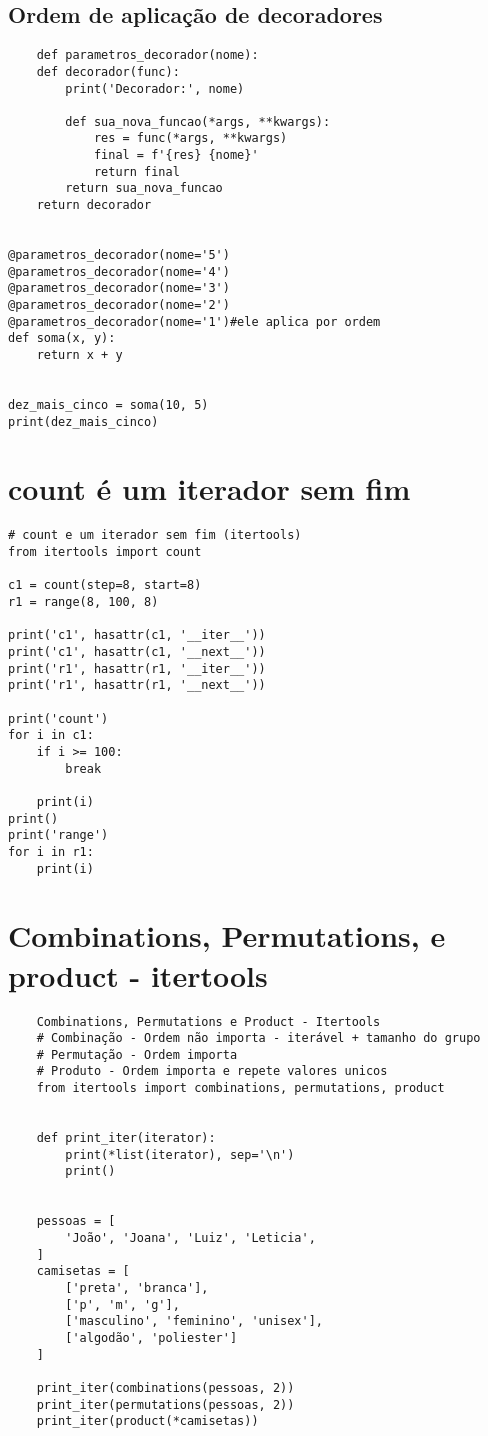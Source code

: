 \documentclass{article}
\begin{document}
\subsection{Ordem de aplicação de decoradores}
\begin{lstlisting}
    def parametros_decorador(nome):
    def decorador(func):
        print('Decorador:', nome)

        def sua_nova_funcao(*args, **kwargs):
            res = func(*args, **kwargs)
            final = f'{res} {nome}'
            return final
        return sua_nova_funcao
    return decorador


@parametros_decorador(nome='5')
@parametros_decorador(nome='4')
@parametros_decorador(nome='3')
@parametros_decorador(nome='2')
@parametros_decorador(nome='1')#ele aplica por ordem
def soma(x, y):
    return x + y


dez_mais_cinco = soma(10, 5)
print(dez_mais_cinco)
\end{lstlisting}    

\section{count é um iterador sem fim}
\begin{lstlisting}
# count e um iterador sem fim (itertools)
from itertools import count

c1 = count(step=8, start=8)
r1 = range(8, 100, 8)

print('c1', hasattr(c1, '__iter__'))
print('c1', hasattr(c1, '__next__'))
print('r1', hasattr(r1, '__iter__'))
print('r1', hasattr(r1, '__next__'))

print('count')
for i in c1:
    if i >= 100:
        break

    print(i)
print()
print('range')
for i in r1:
    print(i)
\end{lstlisting}
\section{Combinations, Permutations, e product - itertools}
\begin{lstlisting}
    Combinations, Permutations e Product - Itertools
    # Combinação - Ordem não importa - iterável + tamanho do grupo
    # Permutação - Ordem importa
    # Produto - Ordem importa e repete valores unicos
    from itertools import combinations, permutations, product
    
    
    def print_iter(iterator):
        print(*list(iterator), sep='\n')
        print()
    
    
    pessoas = [
        'João', 'Joana', 'Luiz', 'Leticia',
    ]
    camisetas = [
        ['preta', 'branca'],
        ['p', 'm', 'g'],
        ['masculino', 'feminino', 'unisex'],
        ['algodão', 'poliester']
    ]
    
    print_iter(combinations(pessoas, 2))
    print_iter(permutations(pessoas, 2))
    print_iter(product(*camisetas))
\end{lstlisting}
\end{document}
